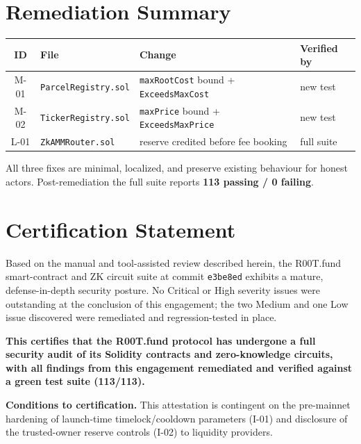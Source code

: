 \documentclass[11pt,a4paper]{article}
\begin{document}
\section{Remediation Summary}

\begin{center}
\begin{tabular}{clll}
\toprule
\textbf{ID} & \textbf{File} & \textbf{Change} & \textbf{Verified by} \\
\midrule
M-01 & \texttt{ParcelRegistry.sol} & \texttt{maxRootCost} bound + \texttt{ExceedsMaxCost} & new test \\
M-02 & \texttt{TickerRegistry.sol} & \texttt{maxPrice} bound + \texttt{ExceedsMaxPrice} & new test \\
L-01 & \texttt{ZkAMMRouter.sol} & reserve credited before fee booking & full suite \\
\bottomrule
\end{tabular}
\end{center}

All three fixes are minimal, localized, and preserve existing behaviour for
honest actors. Post-remediation the full suite reports
\textbf{113 passing / 0 failing}.

\section{Certification Statement}

Based on the manual and tool-assisted review described herein, the R00T.fund
smart-contract and ZK circuit suite at commit \texttt{e3be8ed} exhibits a mature,
defense-in-depth security posture. No Critical or High severity issues were
outstanding at the conclusion of this engagement; the two Medium and one Low issue
discovered were remediated and regression-tested in place.

\begin{tcolorbox}[colback=r00tgreen!8,colframe=r00tgreen,arc=3pt,boxrule=1pt]
\centering
\textbf{This certifies that the R00T.fund protocol has undergone a full security
audit of its Solidity contracts and zero-knowledge circuits, with all findings
from this engagement remediated and verified against a green test suite (113/113).}
\end{tcolorbox}

\vspace{0.6cm}
\noindent\textbf{Conditions to certification.} This attestation is contingent on the
pre-mainnet hardening of launch-time timelock/cooldown parameters (I-01) and
disclosure of the trusted-owner reserve controls (I-02) to liquidity providers.
\end{document}
